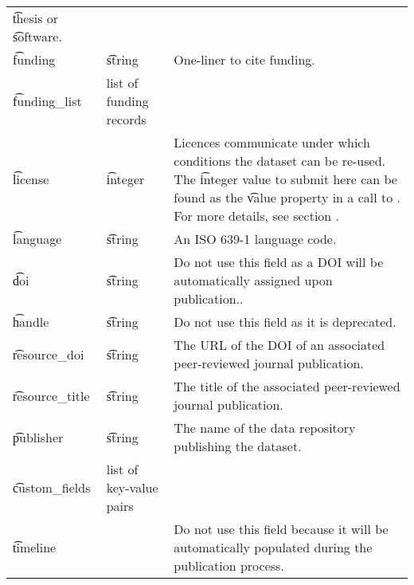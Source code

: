 \begin{tabularx}{\textwidth}{*{2}{!{\VRule[-1pt]}l}!{\VRule[-1pt]}X}
                                              \t{thesis} or \t{software}.\\
  \t{funding}        & \t{string}           & One-liner to cite funding.\\
  \t{funding\_list}  & list of funding records & \\
  \t{license}        & \t{integer}          & Licences communicate under which
                                              conditions the dataset can be
                                              re-used.  The \t{integer} value
                                              to submit here can be found as
                                              the \t{value} property in a call
                                              to . For more
                                              details, see section
                                              .\\
  \t{language}       & \t{string}           & An ISO 639-1 language code.\\
  \t{doi}            & \t{string}           & Do not use this field as a DOI
                                              will be automatically assigned
                                              upon publication..\\
  \t{handle}         & \t{string}           & Do not use this field as it is
                                              deprecated.\\
  \t{resource\_doi}  & \t{string}           & The URL of the DOI of an
                                              associated peer-reviewed
                                              journal publication.\\
  \t{resource\_title} & \t{string}          & The title of the associated
                                              peer-reviewed journal
                                              publication.\\
  \t{publisher}      & \t{string}           & The name of the data repository
                                              publishing the dataset.\\
  \t{custom\_fields} & list of key-value pairs & \\
  \t{timeline}       &                      & Do not use this field because it
                                              will be automatically populated
                                              during the publication process.\\
\end{tabularx}

